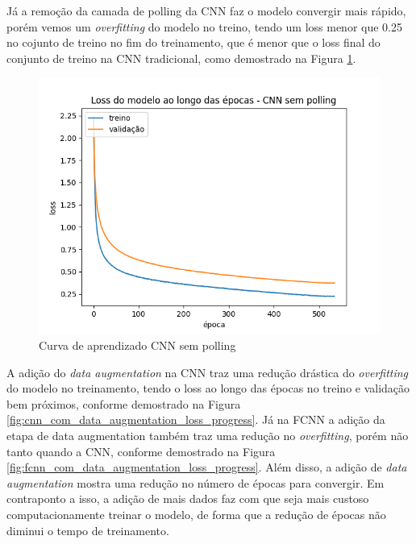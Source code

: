 \documentclass[12pt]{article}
\begin{document}
Já a remoção da camada de polling da CNN faz o modelo convergir mais rápido, porém vemos um \textit{overfitting} do modelo no treino, tendo um loss menor que 0.25 no cojunto de treino no fim do treinamento, que é menor que o loss final do conjunto de treino na CNN tradicional, como demostrado na Figura \ref{fig:cnn_sem_polling_loss_progress}. 


\begin{figure}[ht]
  \centering
  \includegraphics[width=.5\textwidth]{../images/results_plt/cnn_sem_polling_loss_progress.png}
  \caption{Curva de aprendizado CNN sem polling}
  \label{fig:cnn_sem_polling_loss_progress}
\end{figure}

A adição do \textit{data augmentation} na CNN traz uma redução drástica do \textit{overfitting} do modelo no treinamento, tendo o loss ao longo das épocas no treino e validação bem próximos, conforme demostrado na Figura \ref{fig:cnn_com_data_augmentation_loss_progress}. Já na FCNN a adição da etapa de data augmentation também traz uma redução no \textit{overfitting}, porém não tanto quando a CNN, conforme demostrado na Figura \ref{fig:fcnn_com_data_augmentation_loss_progress}. Além disso, a adição de \textit{data augmentation} mostra uma redução no número de épocas para convergir. Em contraponto a isso, a adição de mais dados faz com que seja mais custoso computacionamente treinar o modelo, de forma que a redução de épocas não diminui o tempo de treinamento. 
\end{document}
